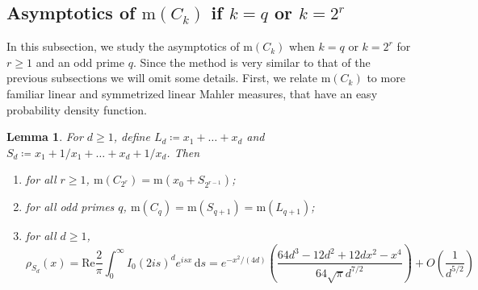 \documentclass[12pt,reqno]{amsart}
\theoremstyle{definition}
\theoremstyle{plain}
\newtheorem{lemma}[theorem]{Lemma}
\theoremstyle{definition}
\newcommand\m{\mathrm{m}}
\renewcommand{\geq}{\geqslant}
\renewcommand{\Re}{\mathrm{Re}}
\renewcommand{\d}{\mathrm{d}}
\begin{document}
\subsection{Asymptotics of $\m(C_k)$ if $k = q$ or $k = 2^r$} \label{subsecas}

In this subsection, we study the asymptotics of $\m(C_k)$ when $k = q$ or $k = 2^r$ for $r \geq 1$ and an odd prime $q$. Since the method is very similar to that of the previous subsections we will omit some details. First, we relate $\m(C_k)$ to more familiar linear and symmetrized  linear Mahler measures, that have an easy probability density function. 

\begin{lemma} \label{lemSd} For $d \geq 1$, define $L_d \coloneqq x_1+\dots+x_d$ and $S_d \coloneqq x_1+1/x_1+\dots+x_d+1/x_d$. Then 
\begin{enumerate}
\item \label{lemSd1} for all $r \geq 1$, $\m(C_{2^r}) = \m(x_0+S_{2^{r-1}})$; 
\item \label{lemSd2} for all odd primes $q$, $\m(C_q) = \m(S_{q+1}) = \m(L_{q+1})$; 
\item \label{lemSd3} for all $d \geq 1$, 
$$\rho_{S_d}(x) = \Re  \frac{2}{\pi}\int_0^\infty I_0(2 i s)^d e^{i s x} \, \d s = e^{-x^2/(4 d)} \left( \frac{64 d^3-12 d^2+12 d x^2-x^4}{64 \sqrt{\pi } d^{7/2}} \right) + O\left(\frac{1}{d^{5/2}}\right)$$

\end{enumerate}
\end{lemma}
\end{document}
